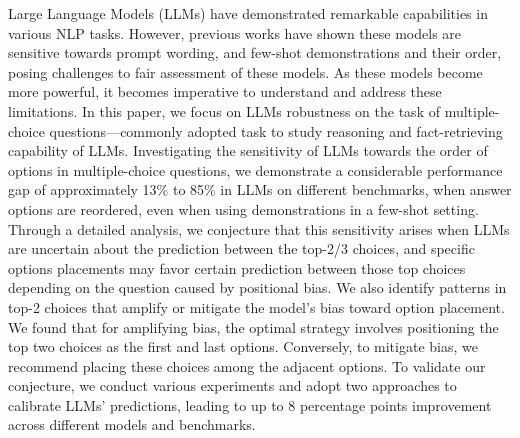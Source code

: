 Large Language Models (LLMs) have demonstrated remarkable capabilities in various NLP tasks.  However, previous works have shown these models are sensitive towards prompt wording, and few-shot demonstrations and their order, posing challenges to fair assessment of these models. As these models become more powerful, it becomes imperative to understand and address these limitations.  In this paper, we focus on LLMs robustness on the task of multiple-choice questions---commonly adopted task to study reasoning and fact-retrieving capability of LLMs. Investigating the sensitivity of LLMs towards the order of options in multiple-choice questions, we demonstrate a considerable performance gap of approximately 13\% to 85\% in LLMs on different benchmarks, when answer options are reordered, even when using demonstrations in a few-shot setting. Through a detailed analysis, we conjecture that this sensitivity arises when LLMs are uncertain about the prediction between the top-2/3 choices, and specific options placements may favor certain prediction between those top choices depending on the question caused by positional bias. We also identify patterns in top-2 choices that amplify or mitigate the model's bias toward option placement. We found that for amplifying bias, the optimal strategy involves positioning the top two choices as the first and last options. Conversely, to mitigate bias, we recommend placing these choices among the adjacent options. To validate our conjecture, we conduct various experiments and adopt two approaches to calibrate LLMs' predictions, leading to up to 8 percentage points improvement across different models and benchmarks.